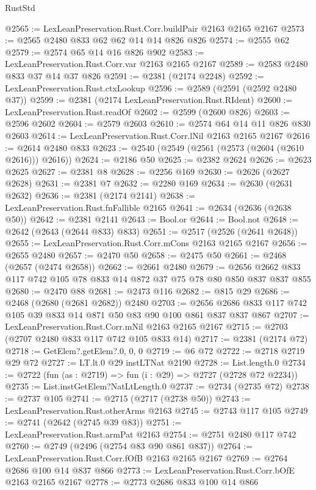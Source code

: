 \begin{lexlean}{RustStd}
\begin{coremodule}
@2565 := LexLeanPreservation.Rust.Corr.buildPair @2163 @2165 @2167
@2573 := @2565 @2480 @833 @62 @62 @14 @14 @826 @826
@2574 := @2555 @62
@2579 := @2574 @65 @14 @16 @826 @902
@2583 := LexLeanPreservation.Rust.Corr.var @2163 @2165 @2167
@2589 := @2583 @2480 @833 @37 @14 @37 @826
@2591 := @2381 (@2174 @2248)
@2592 := LexLeanPreservation.Rust.ctxLookup
@2596 := @2589 (@2591 (@2592 @2480 @37))
@2599 := @2381 (@2174 LexLeanPreservation.Rust.RIdent)
@2600 := LexLeanPreservation.Rust.readOf
@2602 := @2599 (@2600 @826)
@2603 := @2596 @2602
@2604 := @2579 @2603
@2610 := @2574 @64 @14 @11 @826 @830 @2603
@2614 := LexLeanPreservation.Rust.Corr.lNil @2163 @2165 @2167
@2616 := @2614 @2480 @833
@2623 := @2540 (@2549 (@2561 (@2573 (@2604 (@2610 @2616))) @2616))
@2624 := @2186 @50
@2625 := @2382 @2624
@2626 := @2623 @2625
@2627 := @2381 @8
@2628 := @2256 @169
@2630 := @2626 (@2627 @2628)
@2631 := @2381 @7
@2632 := @2280 @169
@2634 := @2630 (@2631 @2632)
@2636 := @2381 (@2174 @2141)
@2638 := LexLeanPreservation.Rust.fnFallible @2165
@2641 := @2634 (@2636 (@2638 @50))
@2642 := @2381 @2141
@2643 := Bool.or
@2644 := Bool.not
@2648 := @2642 (@2643 (@2644 @833) @833)
@2651 := @2517 (@2526 (@2641 @2648))
@2655 := LexLeanPreservation.Rust.Corr.mCons @2163 @2165 @2167
@2656 := @2655 @2480
@2657 := @2470 @50
@2658 := @2475 @50
@2661 := @2468 (@2657 (@2474 @2658))
@2662 := @2661 @2480
@2679 := @2656 @2662 @833 @117 @742 @105 @78 @833 @14 @872 @37 @75 @78 @80 @850 @837 @837 @855
@2680 := @2470 @88
@2681 := @2473 @116
@2682 := @815 @29
@2686 := @2468 (@2680 (@2681 @2682)) @2480
@2703 := @2656 @2686 @833 @117 @742 @105 @39 @833 @14 @871 @50 @83 @90 @100 @861 @837 @837 @867
@2707 := LexLeanPreservation.Rust.Corr.mNil @2163 @2165 @2167
@2715 := @2703 (@2707 @2480 @833 @117 @742 @105 @833 @14)
@2717 := @2381 (@2174 @72)
@2718 := GetElem?.getElem?.{0, 0, 0}
@2719 := @6 @72
@2722 := @2718 @2719 @29 @72
@2727 := LT.lt.{0} @29 instLTNat @2190
@2728 := List.length.{0}
@2734 := @2722 (fun (as : @2719) => fun (i : @29) => @2727 (@2728 @72 @2234))
@2735 := List.instGetElem?NatLtLength.{0}
@2737 := @2734 (@2735 @72)
@2738 := @2737 @105
@2741 := @2715 (@2717 (@2738 @50))
@2743 := LexLeanPreservation.Rust.otherArms @2163
@2745 := @2743 @117 @105
@2749 := @2741 (@2642 (@2745 @39 @83))
@2751 := LexLeanPreservation.Rust.armPat @2163
@2754 := @2751 @2480 @117 @742
@2760 := @2749 (@2496 (@2754 @83 @90 @861 @837))
@2764 := LexLeanPreservation.Rust.Corr.fOfB @2163 @2165 @2167
@2769 := @2764 @2686 @100 @14 @837 @866
@2773 := LexLeanPreservation.Rust.Corr.bOfE @2163 @2165 @2167
@2778 := @2773 @2686 @833 @100 @14 @866

\end{coremodule}
\end{lexlean}
